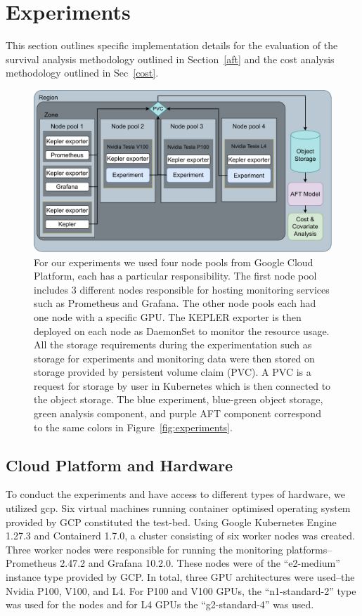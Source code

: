 \documentclass[sn-mathphys-num]{sn-jnl}%
\begin{document}
\section{Experiments}
\label{experiments}

This section outlines specific implementation details for the evaluation of the survival analysis methodology outlined in Section~\ref{aft} and the cost analysis methodology outlined in Sec~\ref{cost}.


\begin{figure}
    \centering
    \includegraphics[width=.9\textwidth]{plots/architecture.pdf}
    \caption{
    For our experiments we used four node pools from Google Cloud Platform, each has a particular responsibility.
    The first node pool includes 3 different nodes responsible for hosting monitoring services such as Prometheus and Grafana.
    The other node pools each had one node with a specific GPU.  The KEPLER exporter is then deployed on each node as DaemonSet to monitor the resource usage.
    All the storage requirements during the experimentation such as storage for experiments and monitoring data were then stored on storage provided by persistent volume claim (PVC).
    A PVC is a request for storage by user in Kubernetes which is then connected to the object storage.
    The blue experiment, blue-green object storage, green analysis component, and purple AFT component correspond to the same colors in Figure~\ref{fig:experiments}.}
    \label{fig:architecture}
\end{figure}



\subsection{Cloud Platform and Hardware}
To conduct the experiments and have access to different types of hardware, we utilized \acrshort{gcp}\@.
Six virtual machines running container optimised operating system provided by GCP constituted the test-bed.
Using Google Kubernetes Engine 1.27.3 and Containerd 1.7.0, a cluster consisting of six worker nodes was created.
Three worker nodes were responsible for running the monitoring platforms-- Prometheus 2.47.2 and Grafana 10.2.0.
These nodes were of the ``e2-medium'' instance type provided by GCP\@.
In total, three GPU architectures were used--the Nvidia P100, V100, and L4\@.
For P100 and V100 GPUs, the ``n1-standard-2'' type was used for the nodes and for L4 GPUs the ``g2-standard-4'' was used.
\end{document}
